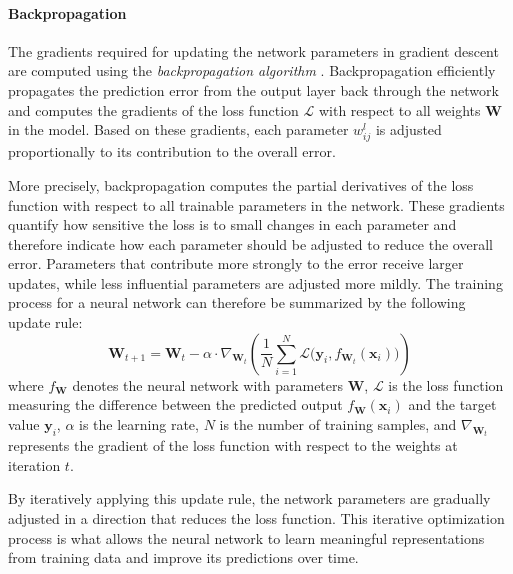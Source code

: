 
\paragraph{Backpropagation}
The gradients required for updating the network parameters in gradient descent are computed using the \textit{backpropagation algorithm} \cite{Rumelhart1986LearningRB}. Backpropagation efficiently propagates the prediction error from the output layer back through the network and computes the gradients of the loss function $\mathcal{L}$ with respect to all weights $\mathbf{W}$ in the model. Based on these gradients, each parameter $w_{ij}^l$ is adjusted proportionally to its contribution to the overall error.

More precisely, backpropagation computes the partial derivatives of the loss function with respect to all trainable parameters in the network. These gradients quantify how sensitive the loss is to small changes in each parameter and therefore indicate how each parameter should be adjusted to reduce the overall error. Parameters that contribute more strongly to the error receive larger updates, while less influential parameters are adjusted more mildly.
The training process for a neural network can therefore be summarized by the following update rule:
\begin{equation}
\mathbf{W}_{t+1} = \mathbf{W}_t - \alpha \cdot \nabla_{\mathbf{W}_t} \left( \frac{1}{N} \sum_{i=1}^{N} \mathcal{L}\bigl(\mathbf{y}_i, f_{\mathbf{W}_t}(\mathbf{x}_i)\bigr) \right)
\end{equation}
where $f_{\mathbf{W}}$ denotes the neural network with parameters $\mathbf{W}$, $\mathcal{L}$ is the loss function measuring the difference between the predicted output $f_{\mathbf{W}}(\mathbf{x}_i)$ and the target value $\mathbf{y}_i$, $\alpha$ is the learning rate, $N$ is the number of training samples, and $\nabla_{\mathbf{W}_t}$ represents the gradient of the loss function with respect to the weights at iteration $t$.

By iteratively applying this update rule, the network parameters are gradually adjusted in a direction that reduces the loss function. This iterative optimization process is what allows the neural network to learn meaningful representations from training data and improve its predictions over time.



